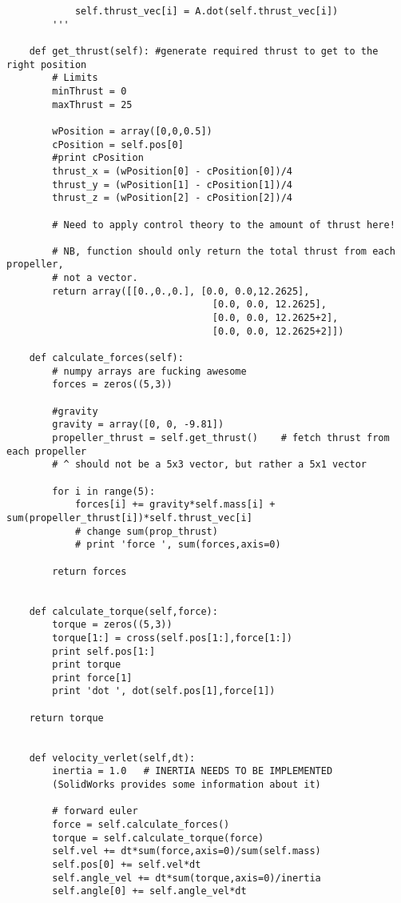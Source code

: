 \begin{lstlisting}
            self.thrust_vec[i] = A.dot(self.thrust_vec[i])
        '''
   
    def get_thrust(self): #generate required thrust to get to the right position
        # Limits
        minThrust = 0
        maxThrust = 25
 
        wPosition = array([0,0,0.5])
        cPosition = self.pos[0]
        #print cPosition
        thrust_x = (wPosition[0] - cPosition[0])/4
        thrust_y = (wPosition[1] - cPosition[1])/4
        thrust_z = (wPosition[2] - cPosition[2])/4
 
        # Need to apply control theory to the amount of thrust here!
       
        # NB, function should only return the total thrust from each propeller, 
        # not a vector.
        return array([[0.,0.,0.], [0.0, 0.0,12.2625],
                                    [0.0, 0.0, 12.2625],
                                    [0.0, 0.0, 12.2625+2],
                                    [0.0, 0.0, 12.2625+2]])
 
    def calculate_forces(self):
        # numpy arrays are fucking awesome
        forces = zeros((5,3))
   
        #gravity
        gravity = array([0, 0, -9.81])
        propeller_thrust = self.get_thrust()    # fetch thrust from each propeller
        # ^ should not be a 5x3 vector, but rather a 5x1 vector
       
        for i in range(5):
            forces[i] += gravity*self.mass[i] + sum(propeller_thrust[i])*self.thrust_vec[i] 
            # change sum(prop_thrust)
            # print 'force ', sum(forces,axis=0)

        return forces
   
   
    def calculate_torque(self,force):
        torque = zeros((5,3))
        torque[1:] = cross(self.pos[1:],force[1:])
	    print self.pos[1:]
	    print torque
	    print force[1]
	    print 'dot ', dot(self.pos[1],force[1])
 
    return torque
 
 
    def velocity_verlet(self,dt):
        inertia = 1.0   # INERTIA NEEDS TO BE IMPLEMENTED 
        (SolidWorks provides some information about it)
       
        # forward euler
        force = self.calculate_forces()
        torque = self.calculate_torque(force)
        self.vel += dt*sum(force,axis=0)/sum(self.mass)
        self.pos[0] += self.vel*dt
        self.angle_vel += dt*sum(torque,axis=0)/inertia
        self.angle[0] += self.angle_vel*dt
        

\end{lstlisting}

